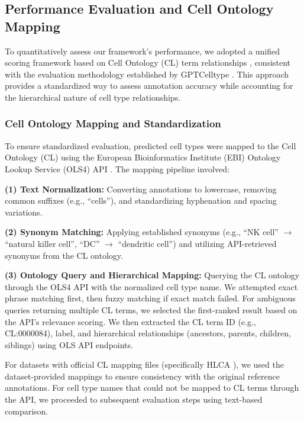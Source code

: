 \documentclass[pdflatex,sn-nature]{sn-jnl}%
\theoremstyle{thmstyleone}%
\theoremstyle{thmstyletwo}%
\theoremstyle{thmstylethree}%
\begin{document}
\subsection{Performance Evaluation and Cell Ontology Mapping}

To quantitatively assess our framework's performance, we adopted a unified scoring framework based on Cell Ontology (CL) term relationships \cite{diehlTheCell2016}, consistent with the evaluation methodology established by GPTCelltype \cite{houAssessingGPT4Cell2024}. This approach provides a standardized way to assess annotation accuracy while accounting for the hierarchical nature of cell type relationships.

\subsubsection{Cell Ontology Mapping and Standardization}
To ensure standardized evaluation, predicted cell types were mapped to the Cell Ontology (CL) using the European Bioinformatics Institute (EBI) Ontology Lookup Service (OLS4) API \cite{jupp2015new}. The mapping pipeline involved:

\textbf{(1) Text Normalization:} Converting annotations to lowercase, removing common suffixes (e.g., ``cells''), and standardizing hyphenation and spacing variations.

\textbf{(2) Synonym Matching:} Applying established synonyms (e.g., ``NK cell'' $\rightarrow$ ``natural killer cell'', ``DC'' $\rightarrow$ ``dendritic cell'') and utilizing API-retrieved synonyms from the CL ontology.

\textbf{(3) Ontology Query and Hierarchical Mapping:} Querying the CL ontology through the OLS4 API with the normalized cell type name. We attempted exact phrase matching first, then fuzzy matching if exact match failed. For ambiguous queries returning multiple CL terms, we selected the first-ranked result based on the API's relevance scoring. We then extracted the CL term ID (e.g., CL:0000084), label, and hierarchical relationships (ancestors, parents, children, siblings) using OLS API endpoints.

For datasets with official CL mapping files (specifically HLCA \cite{sikkemaIntegratedCellAtlas2023}), we used the dataset-provided mappings to ensure consistency with the original reference annotations. For cell type names that could not be mapped to CL terms through the API, we proceeded to subsequent evaluation steps using text-based comparison.
\end{document}

